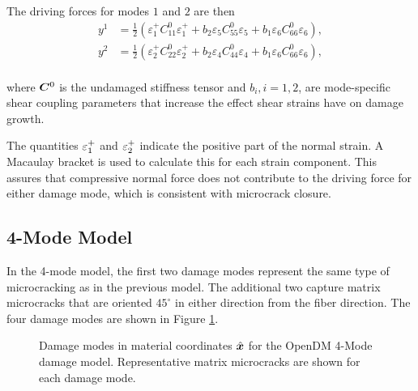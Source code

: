 \documentclass[11pt]{article}
\begin{document}
The driving forces for modes \(1\) and \(2\) are then
\begin{equation}
  \label{eq:OpenDM2_DrivingForces}
  \begin{split}
    y^1 &= \frac{1}{2} (
    \varepsilon_{1}^+ C^0_{11} \varepsilon_{1}^+ + 
    b_2 \varepsilon_{5} C^0_{55} \varepsilon_{5} + 
    b_1 \varepsilon_{6} C^0_{66} \varepsilon_{6} ), \\ 
    y^2 &= \frac{1}{2} (
    \varepsilon_{2}^+ C^0_{22} \varepsilon_{2}^+ + 
    b_2 \varepsilon_{4} C^0_{44} \varepsilon_{4} + 
    b_1 \varepsilon_{6} C^0_{66} \varepsilon_{6} ), \\ 
  \end{split}
\end{equation}

where \(\bm{C}^0\) is the undamaged stiffness tensor and \(b_i, i=1,2\), are
mode-specific shear coupling parameters that increase the effect shear
strains have on damage growth.

The quantities \(\varepsilon_{1}^+\) and \(\varepsilon_{2}^+\) indicate the
positive part of the normal strain. A Macaulay bracket is used to
calculate this for each strain component. This assures that
compressive normal force does not contribute to the driving force for
either damage mode, which is consistent with microcrack closure.

\subsection{4-Mode Model}
\label{sec:org644d031}
In the 4-mode model, the first two damage modes represent the same
type of microcracking as in the previous model. The additional two
capture matrix microcracks that are oriented \(45^\circ\) in either
direction from the fiber direction. The four damage modes are shown in
Figure \ref{fig:OpenDM4_DamageModes}.
\begin{figure}[h!]
  \centering
  \def\svgwidth{0.8\linewidth}
  
  \caption{Damage modes in material coordinates $\hat{\bm{x}}$ for the OpenDM 4-Mode
    damage model. Representative matrix microcracks are shown for each
    damage mode.}
  \label{fig:OpenDM4_DamageModes}
\end{figure}
\end{document}
